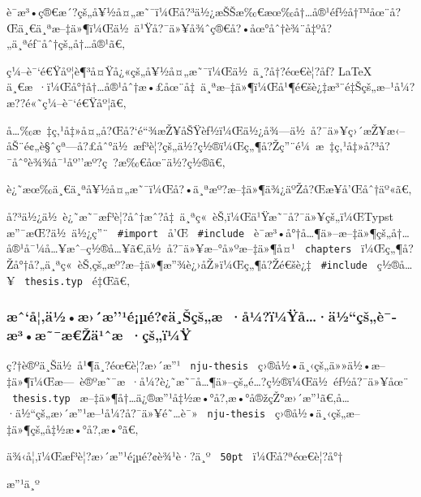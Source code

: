 è¯­æ³•ç®€æ´?çš„å¥½å¤„æ˜¯ï¼Œå?³ä½¿æŠŠæ‰€æœ‰å†\ldots å®¹éƒ½å†™åœ¨å?Œä¸€ä¸ªæ--‡ä»¶ï¼Œä½~ä¹Ÿå?¯ä»¥å¾ˆç®€å?•åœ°åˆ†è¾¨å‡ºå?„ä¸ªéƒ¨åˆ†çš„å†\ldots å®¹ã€‚

ç¼--è¯`é€Ÿåº¦è¶³å¤Ÿå¿«çš„å¥½å¤„æ˜¯ï¼Œä½~ä¸?å†?éœ€è¦?åƒ? LaTeX
ä¸€æ~·ï¼Œå°†å†\ldots å®¹åˆ†æ•£åœ¨å‡~ä¸ªæ--‡ä»¶ï¼Œå¹¶é€šè¿‡æ³¨é‡Šçš„æ--¹å¼?æ??é«˜ç¼--è¯`é€Ÿåº¦ã€‚

å\ldots‰æ~‡ç‚¹å‡»å¤„å?Œå?{}`é``¾æŽ¥åŠŸèƒ½ï¼Œä½¿å¾---ä½~å?¯ä»¥ç›´æŽ¥æ‹--åŠ¨é¢„è§ˆçª---å?£åˆ°ä½~æƒ³è¦?çš„ä½?ç½®ï¼Œç„¶å?Žç''¨é¼~æ~‡ç‚¹å‡»å?³å?¯åˆ°è¾¾å¯¹åº''æº?ç~?æ‰€åœ¨ä½?ç½®ã€‚

è¿˜æœ‰ä¸€ä¸ªå¥½å¤„æ˜¯ï¼Œå?•ä¸ªæº?æ--‡ä»¶ä¾¿äºŽå?Œæ­¥å'Œåˆ†äº«ã€‚

å?³ä½¿ä½~è¿˜æ˜¯æƒ³è¦?åˆ†æˆ?å‡~ä¸ªç«~èŠ‚ï¼Œä¹Ÿæ˜¯å?¯ä»¥çš„ï¼ŒTypst
æ''¯æŒ?ä½~ä½¿ç''¨ \texttt{\ \#import\ } å'Œ \texttt{\ \#include\ }
è¯­æ³•å°†å\ldots¶ä»--æ--‡ä»¶çš„å†\ldots å®¹å¯¼å\ldots¥æˆ--ç½®å\ldots¥ã€‚ä½~å?¯ä»¥æ--°å»ºæ--‡ä»¶å¤¹
\texttt{\ chapters\ }
ï¼Œç„¶å?Žå°†å?„ä¸ªç«~èŠ‚çš„æº?æ--‡ä»¶æ''¾è¿›åŽ»ï¼Œç„¶å?Žé€šè¿‡
\texttt{\ \#include\ } ç½®å\ldots¥ \texttt{\ thesis.typ\ } é‡Œã€‚

\subsubsection{æˆ`å¦‚ä½•æ›´æ''¹é¡µé?¢ä¸Šçš„æ~·å¼?ï¼Ÿå\ldots·ä½``çš„è¯­æ³•æ˜¯æ€Žä¹ˆæ~·çš„ï¼Ÿ}\label{uxe6ux2c6uxe5uxe4uxbduxe6uxe6uxb9uxe9uxb5uxe9uxe4ux161uxe7ux161uxe6-uxe5uxbcuxefuxbcuxffuxe5uxe4uxbduxe7ux161uxe8uxe6uxb3uxe6uxe6ux17euxe4uxb9ux2c6uxe6-uxe7ux161uxefuxbcuxff}

ç?†è®ºä¸Šä½~å¹¶ä¸?éœ€è¦?æ›´æ''¹ \texttt{\ nju-thesis\ }
ç›®å½•ä¸‹çš„ä»»ä½•æ--‡ä»¶ï¼Œæ---~è®ºæ˜¯æ~·å¼?è¿˜æ˜¯å\ldots¶ä»--çš„é\ldots?ç½®ï¼Œä½~éƒ½å?¯ä»¥åœ¨
\texttt{\ thesis.typ\ }
æ--‡ä»¶å†\ldots ä¿®æ''¹å‡½æ•°å?‚æ•°å®žçŽ°æ›´æ''¹ã€‚å\ldots·ä½``çš„æ›´æ''¹æ--¹å¼?å?¯ä»¥é˜\ldots è¯»
\texttt{\ nju-thesis\ } ç›®å½•ä¸‹çš„æ--‡ä»¶çš„å‡½æ•°å?‚æ•°ã€‚

ä¾‹å¦‚ï¼Œæƒ³è¦?æ›´æ''¹é¡µé?¢è¾¹è·?ä¸º \texttt{\ 50pt\ } ï¼Œå?ªéœ€è¦?å°†

\begin{Shaded}
\begin{Highlighting}[]
\end{Highlighting}
\end{Shaded}

æ''¹ä¸º

\begin{Shaded}
\begin{Highlighting}[]
\end{Highlighting}
\end{Shaded}

